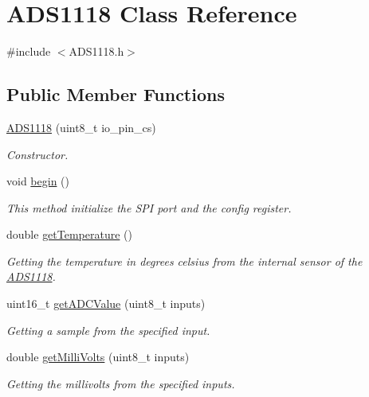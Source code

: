 \hypertarget{class_a_d_s1118}{}\section{A\+D\+S1118 Class Reference}
\label{class_a_d_s1118}


{\ttfamily \#include $<$A\+D\+S1118.\+h$>$}

\subsection*{Public Member Functions}
\begin{DoxyCompactItemize}
\item 
\mbox{\hyperlink{class_a_d_s1118_afaddf1d46e3b32d433c67122d96a6ebb}{A\+D\+S1118}} (uint8\+\_\+t io\+\_\+pin\+\_\+cs)
\begin{DoxyCompactList}\small\item\em Constructor. \end{DoxyCompactList}\item 
void \mbox{\hyperlink{class_a_d_s1118_a817f1a7619d97e19475458dc3eea5f88}{begin}} ()
\begin{DoxyCompactList}\small\item\em This method initialize the S\+PI port and the config register. \end{DoxyCompactList}\item 
double \mbox{\hyperlink{class_a_d_s1118_acf67a3c09b9d165f04e2e37e618e4fcb}{get\+Temperature}} ()
\begin{DoxyCompactList}\small\item\em Getting the temperature in degrees celsius from the internal sensor of the \mbox{\hyperlink{class_a_d_s1118}{A\+D\+S1118}}. \end{DoxyCompactList}\item 
uint16\+\_\+t \mbox{\hyperlink{class_a_d_s1118_adf872650d20977b5872f88fa36182d3a}{get\+A\+D\+C\+Value}} (uint8\+\_\+t inputs)
\begin{DoxyCompactList}\small\item\em Getting a sample from the specified input. \end{DoxyCompactList}\item 
double \mbox{\hyperlink{class_a_d_s1118_a11e4c070217773d71da1d22506e64c00}{get\+Milli\+Volts}} (uint8\+\_\+t inputs)
\begin{DoxyCompactList}\small\item\em Getting the millivolts from the specified inputs. \end{DoxyCompactList}\item 

\end{DoxyCompactItemize}

